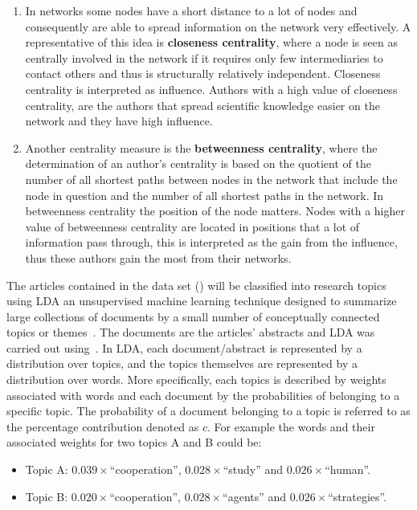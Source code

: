 \begin{enumerate}
    \item In networks some nodes have a short distance to a lot of nodes and
    consequently are able to spread information on the network very effectively.
    A representative of this idea is \textbf{closeness centrality}, where a node
    is seen as centrally involved in the network if it requires only few
    intermediaries to contact others and thus is structurally relatively
    independent. Closeness centrality is interpreted as influence. Authors with a high
    value of closeness centrality, are the authors that spread scientific
    knowledge easier on the network and they have high influence.
    \item Another centrality measure is the \textbf{betweenness centrality},
    where the determination of an author's centrality is based on the quotient
    of the number of all shortest paths between nodes in the network that
    include the node in question and the number of all shortest paths in the
    network. In betweenness centrality the position of the node matters. Nodes
    with a higher value of betweenness centrality are located in positions that
    a lot of information pass through, this is interpreted as the gain from
    the influence, thus these authors gain the most from their networks.
\end{enumerate}

The articles contained in the data set (\cite{pd_data_2018}) will be classified
into research topics using LDA an unsupervised machine learning technique
designed to summarize large collections of documents by a small number of
conceptually connected topics or themes~\cite{Blei2003, Grimmer2013}. The
documents are the articles' abstracts and LDA was carried out using~\cite{rehurek_lrec}.
In LDA, each document/abstract is represented by a distribution over topics,
and the topics themselves are represented by a distribution over words. More
specifically, each topics is described by weights associated with words and
each document by the probabilities of belonging to a specific topic. The
probability of a document belonging to a topic is referred to as the percentage
contribution denoted as \(c\). For example the words and their associated
weights for two topics A and B could be:

\begin{itemize}
    \item Topic A: \(0.039 \times\)``cooperation'', \(0.028 \times\)``study'' and \(0.026 \times\)``human''.
    \item Topic B: \(0.020 \times\)``cooperation'', \(0.028 \times\)``agents'' and
    \(0.026 \times\)``strategies''.
\end{itemize}

